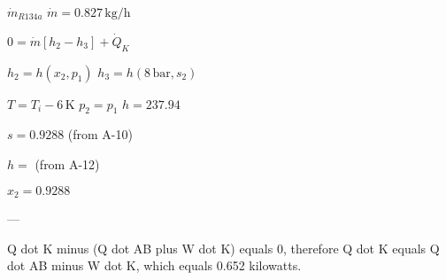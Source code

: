 \( \dot{m}_{R134a} \)  
\( \dot{m} = 0.827 \, \text{kg/h} \)  

\( 0 = \dot{m} [h_2 - h_3] + \dot{Q}_K \)  

\( h_2 = h(x_2, p_1) \)  
\( h_3 = h(8 \, \text{bar}, s_2) \)  

\( T = T_i - 6 \, \text{K} \)  
\( p_2 = p_1 \)  
\( h = 237.94 \)  

\( s = 0.9288 \) (from A-10)  

\( h = \) (from A-12)  

\( x_2 = 0.9288 \)  

---

Q dot K minus (Q dot AB plus W dot K) equals 0, therefore Q dot K equals Q dot AB minus W dot K, which equals 0.652 kilowatts.